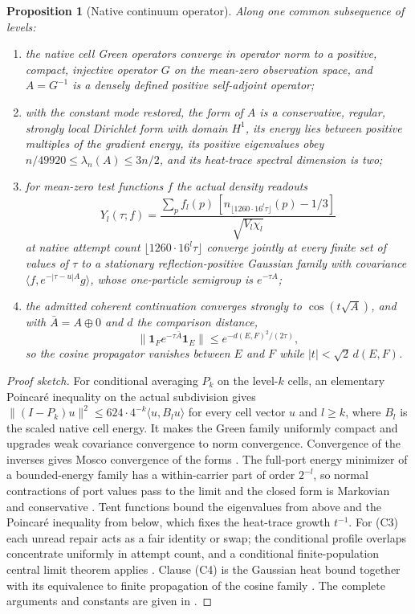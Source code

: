 \documentclass[11pt]{article}
\newtheorem{proposition}[theorem]{Proposition}
\theoremstyle{definition}
\theoremstyle{remark}
\begin{document}
\begin{proposition}[Native continuum operator]
\label{prop:native-continuum}
Along one common subsequence of levels:
\begin{enumerate}[label=(C\arabic*),leftmargin=2.4em]
\item the native cell Green operators converge in operator norm to a
positive, compact, injective operator $G$ on the mean-zero observation
space, and $A=G^{-1}$ is a densely defined positive self-adjoint operator;
\item with the constant mode restored, the form of $A$ is a conservative,
regular, strongly local Dirichlet form with domain $H^1$, its energy lies
between positive multiples of the gradient energy, its positive eigenvalues
obey $n/49920\le\lambda_n(A)\le3n/2$, and its heat-trace spectral dimension
is two;
\item for mean-zero test functions $f$ the actual density readouts
\[
Y_l(\tau;f)=\frac{\sum_pf_l(p)\,[n_{\lfloor1260\cdot16^l\tau\rfloor}(p)-1/3]}{\sqrt{V_l\chi_l}}
\]
at native attempt count $\lfloor1260\cdot16^l\tau\rfloor$ converge jointly
at every finite set of values of $\tau$ to a stationary reflection-positive
Gaussian family with covariance $\langle f,e^{-|\tau-u|A}g\rangle$, whose
one-particle semigroup is $e^{-\tau A}$;
\item the admitted coherent continuation converges strongly to
$\cos(t\sqrt A)$, and with $\bar A=A\oplus0$ and $d$ the comparison
distance,
\[
\|\mathbf 1_Fe^{-\tau\bar A}\mathbf 1_E\|\le e^{-d(E,F)^2/(2\tau)},
\]
so the cosine propagator vanishes between $E$ and $F$ while
$|t|<\sqrt2\,d(E,F)$.
\end{enumerate}
\end{proposition}

\begin{proof}[Proof sketch]
For conditional averaging $P_k$ on the level-$k$ cells, an elementary
Poincar\'e inequality on the actual subdivision gives
$\|(I-P_k)u\|^2\le624\cdot4^{-k}\langle u,B_lu\rangle$ for every cell vector
$u$ and $l\ge k$, where $B_l$ is the scaled native cell energy. It makes the
Green family uniformly compact and upgrades weak covariance convergence to
norm convergence. Convergence of the inverses gives Mosco convergence of the
forms \cite{mosco1994}. The full-port energy minimizer of a bounded-energy
family has a within-carrier part of order $2^{-l}$, so normal contractions of
port values pass to the limit and the closed form is Markovian and
conservative \cite{fukushima2011}. Tent functions bound the eigenvalues from
above and the Poincar\'e inequality from below, which fixes the heat-trace
growth $t^{-1}$. For (C3) each unread repair acts as a fair identity or
swap; the conditional profile overlaps concentrate uniformly in attempt
count, and a conditional finite-population central limit theorem applies
\cite{li2016finitepopulation}. Clause (C4) is the Gaussian heat bound
together with its equivalence to finite propagation of the cosine family
\cite{coulhon2006}. The complete arguments and constants are given in
\cite{ophcontinuum,ophtimefields}.
\end{proof}
\end{document}
